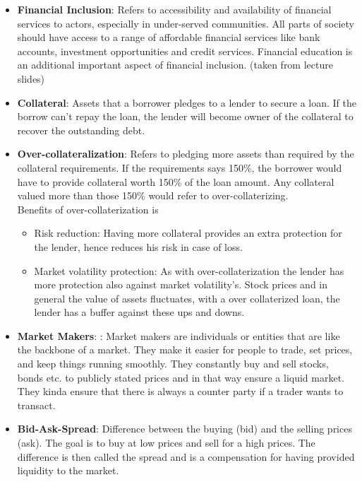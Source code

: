 \documentclass{article}
\begin{document}
\begin{itemize}
    \item \textbf{Financial Inclusion}: Refers to accessibility and availability of financial services to actors, especially in under-served communities. All parts of society should have access to a range of affordable financial services like bank accounts, investment opportunities and credit services. Financial education is an additional important aspect of financial inclusion. 
    (taken from lecture slides)
    \item \textbf{Collateral}:  Assets that a borrower pledges to a lender to secure a loan.
    If the borrow can't repay the loan, the lender will become owner of the collateral to recover the outstanding debt.
    
    \item \textbf{Over-collateralization}: Refers to pledging more assets than required by the collateral requirements. If the requirements says 150\%, the borrower would have to provide collateral worth 150\% of the loan amount. Any collateral valued more than those 150\% would refer to over-collaterizing.\\
    Benefits of over-collaterization is
    \begin{itemize}
     \item {Risk reduction}:
        Having more collateral provides an extra protection for the lender, hence reduces his risk in case of loss.  
    \item {Market volatility protection}:
    As with over-collaterization the lender has more protection also against market volatility's. Stock prices and in general the value of assets fluctuates, with a over collaterized loan, the lender has a buffer against these ups and downs.
     \end{itemize}

     \item \textbf{Market Makers}: :
        Market makers are individuals or entities that are like the backbone of a market. They make it easier for people to trade, set prices, and keep things running smoothly. They constantly buy and sell stocks, bonds etc. to publicly stated prices and in that way ensure a liquid market. They kinda ensure that there is always a counter party if a trader wants to transact.
    \item \textbf{Bid-Ask-Spread}: Difference between the buying (bid) and the selling prices (ask). The goal is to buy at low prices and sell for a high prices. The difference is then called the spread and is a compensation for having provided liquidity to the market.
        

\end{itemize}
\end{document}
